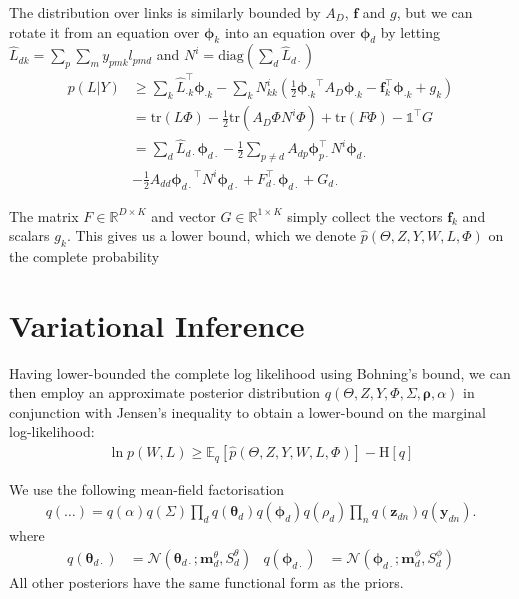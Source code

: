 \documentclass{sciposter}
\newcommand \ent[1] {
    \text{H} \left[ #1 \right]
}
\newcommand \ex[2] {
    \mathbb{E}_{ { #2 } }\left[ #1 \right]
}
\newcommand \halve[1] {
	\frac{#1}{2}
}
\newcommand \half {
    \halve{1}
}
\newcommand \tr { \text{tr} }
\newcommand \T { ^\top }
\newcommand \vv[1] { \bm #1 }
\newcommand \diag[1] { \text{diag} \left( {#1} \right) }
\newcommand \thd[0]  { { \vv \theta_d } }
\newcommand \Tr[1]   { \tr \left(  {#1}  \right) }
\newcommand \MReal[2] { { \mathbb{R}^{#1 \times #2} } }
\newcommand \one  {{  \mathds{1} }}
\newcommand \thdo { { \vv{\theta}_{d\cdot} } }
\newcommand \phok { { \vv{\phi}_{\cdot k} } }
\newcommand \phdo { { \vv{\phi}_{d\cdot} } }
\begin{document}
\begin{multicols}{3}
The distribution over links is similarly bounded by $A_D$, $\vv{f}$ and $g$, but we can rotate it from an equation over $\vv{\phi}_k$ into an equation over $\vv{\phi}_d$ by letting $\hat{L}_{dk} = \sum_p \sum_m y_{pmk} l_{pmd}$ and $N^i = \diag{\sum_d \hat{L}_{d\cdot}}$
\begin{equation*}
\begin{aligned}
p(L|Y) & \geq \sum_k \hat{L}_{\cdot k}\T \phok  - \sum_k N^i_{kk} \left(\half \phok\T A_D \phok - \vv{f}_k\T \phok + g_k\right) \\
& = \Tr{L \Phi} - \half \Tr{A_D \Phi N^i \Phi} + \Tr{F \Phi} - \one\T G  \\
& = \sum_d \hat{L}_{d\cdot} \phdo - \half \sum_{p \neq d} A_{dp} \vv{\phi}_{p\cdot}\T N^i \phdo \\
&-\half A_{dd} \phdo\T N^i \phdo + F_{d\cdot}\T\phdo + G_{d\cdot}
\end{aligned}
\end{equation*}

The matrix $F \in \MReal{D}{K}$ and vector $G \in \MReal{1}{K}$ simply collect the vectors $\vv{f}_k$ and scalars $g_k$. This gives us a lower bound, which we denote $\hat{p}(\Theta, Z, Y, W, L, \Phi)$  on the complete probability

\section{Variational Inference}

\newcommand \mtd { { \vv{m}^{\theta}_d } }
\newcommand \std { { S^\theta_d } }
\newcommand \mpd { { \vv{m}^{\phi}_d } }
\newcommand \spd { { S^\phi_d } }

Having lower-bounded the complete log likelihood using Bohning's bound, we can then employ an approximate posterior distribution $q(\Theta, Z, Y, \Phi, \Sigma, \vv{\rho}, \alpha)$ in conjunction with Jensen's inequality to obtain a lower-bound on the marginal log-likelihood:
\begin{align*}
\ln p(W, L) \geq \ex{\hat{p}(\Theta, Z, Y, W, L, \Phi)}{q} - \ent{q}
\end{align*}

We use the following mean-field factorisation
\begin{align*}
q(\ldots) = q(\alpha)q(\Sigma)\prod_d q(\thd)q(\vv{\phi}_d)q(\rho_d)\prod_n q(\vv{z}_{dn})q(\vv{y}_{dn}).
\end{align*}
where 
\begin{align*}
q(\thdo) &= \mathcal{N}\left(\thdo; \mtd, \std \right) &
q(\phdo) &= \mathcal{N}\left(\phdo; \mpd, \spd\right) 
\end{align*}
All other posteriors have the same functional form as the priors.\\


\end{multicols}
\end{document}
